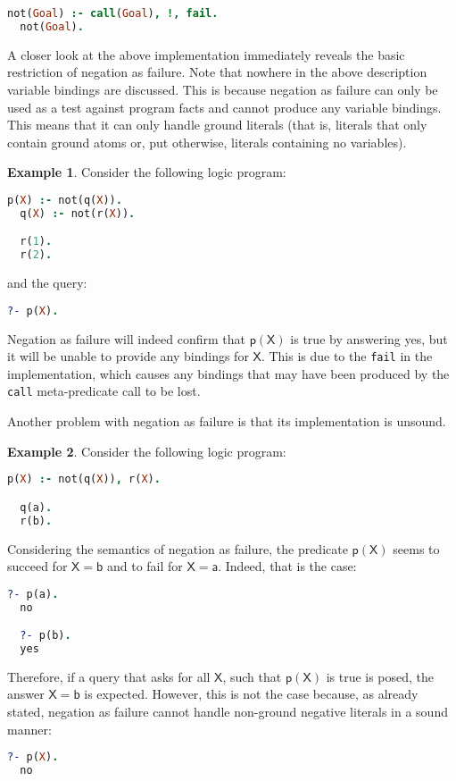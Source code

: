 \documentclass[inscr,ack,preface]{dithesis}
\theoremstyle{definition}
\newtheorem{example}{Example}[chapter]
\newcommand{\msf}[1]{$\mathsf{#1}$}
\begin{document}
\begin{lstlisting}[language=Prolog,frame=single]
  not(Goal) :- call(Goal), !, fail.
  not(Goal).
\end{lstlisting}

A closer look at the above implementation immediately reveals the basic restriction of negation as failure. Note that nowhere in the above description variable bindings are discussed. This is because negation as failure can only be used as a test against program facts and cannot produce any variable bindings. This means that it can only handle ground literals (that is, literals that only contain ground atoms or, put otherwise, literals containing no variables).

\begin{example} Consider the following logic program:
\begin{lstlisting}[language=Prolog,frame=single]
  p(X) :- not(q(X)).
  q(X) :- not(r(X)).

  r(1).
  r(2).
\end{lstlisting}
and the query:
\begin{lstlisting}[language=Prolog,frame=single]
  ?- p(X).
\end{lstlisting}
Negation as failure will indeed confirm that \msf{p(X)} is true by answering yes, but it will be unable to provide any bindings for \msf{X}. This is due to the \texttt{fail} in the implementation, which causes any bindings that may have been produced by the \texttt{call} meta-predicate call to be lost.
\end{example}

Another problem with negation as failure is that its implementation is unsound.
\begin{example} Consider the following logic program:
\begin{lstlisting}[language=Prolog,frame=single]
  p(X) :- not(q(X)), r(X).

  q(a).
  r(b).
\end{lstlisting}
Considering the semantics of negation as failure, the predicate \msf{p(X)} seems to succeed for \msf{X = b} and to fail for \msf{X = a}. Indeed, that is the case:
\begin{lstlisting}[language=Prolog,frame=single]
  ?- p(a).
  no

  ?- p(b).
  yes
\end{lstlisting}
Therefore, if a query that asks for all \msf{X}, such that \msf{p(X)} is true is posed, the answer \msf{X = b} is expected. However, this is not the case because, as already stated, negation as failure cannot handle non-ground negative literals in a sound manner:
\begin{lstlisting}[language=Prolog,frame=single]
  ?- p(X).
  no
\end{lstlisting}
\end{example}
\end{document}
